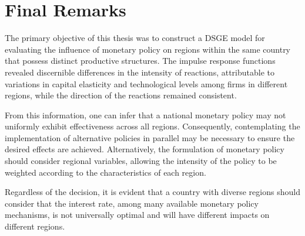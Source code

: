 \documentclass[../thesis.tex]{subfiles}
\begin{document}
	\newpage
	
	\section{Final Remarks}\label{sec:final-remarks}

The primary objective of this thesis was to construct a DSGE model for evaluating the influence of monetary policy on regions within the same country that possess distinct productive structures. The impulse response functions revealed discernible differences in the intensity of reactions, attributable to variations in capital elasticity and technological levels among firms in different regions, while the direction of the reactions remained consistent.

From this information, one can infer that a national monetary policy may not uniformly exhibit effectiveness across all regions. Consequently, contemplating the implementation of alternative policies in parallel may be necessary to ensure the desired effects are achieved. Alternatively, the formulation of monetary policy should consider regional variables, allowing the intensity of the policy to be weighted according to the characteristics of each region.

Regardless of the decision, it is evident that a country with diverse regions should consider that the interest rate, among many available monetary policy mechanisms, is not universally optimal and will have different impacts on different regions.

\begin{comment}
	The model presented here contemplates some features that characterize a New Keynesian model. For future studies, it should be considered to implement more elements, such as 
	\begin{enumerate*}[label=(\arabic*)]
		\item non-Ricardiand households, as a considerable part of Brasilian population has no access to credit;
		\item habit formation, as this feature describes better the household behavior;
		\item labor market, as its rigidities contribute for a better adherence of the model to reality;
		\item a fiscal authority, as the influence of government decisions are important to the private agents;
		\item adjustment costs on investment, considering that the higher the investment, the more expensive it becomes;
		\item bonds and other assets, as there are different financial products to choose from in the economy;
		\item foreign market, as the other economies in the world can influence the internal decisions.
	\end{enumerate*}
\end{comment}
\end{document}
